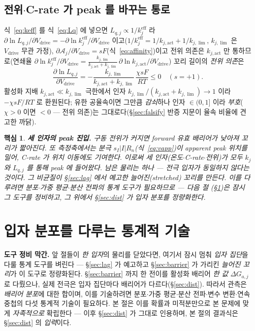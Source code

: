 \documentclass[11pt,a4paper]{article}
\newtheorem*{keybox}{핵심}
\newcommand{\eff}{\mathrm{eff}}
\newcommand{\drive}{\mathrm{drive}}
\begin{document}
\subsection{전위$\cdot$C-rate 가 peak 를 바꾸는 통로}
식~\eqref{eq:keff} 를 식~\eqref{eq:Lq} 에 넣으면 $L_{q,j}\propto1/k_j^{\eff}$ 라 $\partial\ln L_{q,j}/\partial V_\drive=-\partial\ln k_j^{\eff}/\partial V_\drive$ 이고($1/k_j^{\eff}=1/k_{j,\mathrm{act}}+1/k_{j,\lim}$,
$k_{j,\lim}$ 은 $V_\drive$ 무관 가정), $\partial\mathcal A_j/\partial V_\drive=sF$(식~\eqref{eq:affinity})이고 전위 의존은
$k_{j,\mathrm{act}}$ 만 통하므로(연쇄율 $\partial\ln k_j^{\eff}/\partial V_\drive=\tfrac{k_{j,\lim}}{k_{j,\mathrm{act}}+k_{j,\lim}}\,\partial\ln k_{j,\mathrm{act}}/\partial V_\drive$)
꼬리 길이의 \emph{전위 의존}은
\begin{equation}
\frac{\partial\ln L_{q,j}}{\partial V_\drive}=-\frac{k_{j,\lim}}{k_{j,\mathrm{act}}+k_{j,\lim}}\,\frac{\chi sF}{RT}\le0\quad(s=+1).
\label{eq:LqV}
\end{equation}
활성화 지배 $k_{j,\mathrm{act}}\ll k_{j,\lim}$ 극한에서 인자 $k_{j,\lim}/(k_{j,\mathrm{act}}+k_{j,\lim})\to1$ 이라 $-\chi sF/RT$ 로
환원된다; 유한 공율속이면 그만큼 \emph{감쇠}하나 인자 $\in(0,1]$ 이라 \emph{부호}($\chi>0$ 이면 $<0$ — 전위 의존)는
그대로다(\S\ref{sec:falsify} 반증 지문이 율속 비율에 견고한 까닭).
\begin{keybox}
\textbf{세 인자의 peak 진입.} 구동 전위가 커지면 forward 유효 배리어가 낮아져 꼬리가 \emph{짧아진다}. 또 측정축에서는 분극
$s_I|I|R_n$(식~\eqref{eq:vapp})이 apparent peak 위치를 밀어, C-rate 가 \emph{위치} 이동에도 기여한다. \emph{이로써
세 인자(온도$\cdot$C-rate$\cdot$전위)가 모두 $k_j$ 와 $L_{q,j}$ 를 통해 peak 에 들어왔다.} 남은 물리는 하나 —
전극 입자가 \emph{동일하지 않다}는 것이다. 그 비균질이 \S\ref{sec:lag} 에서 예고한 \emph{늘어진}(stretched) 꼬리를
만든다. 이를 다루려면 분포$\cdot$가중 평균$\cdot$분산 전파의 통계 도구가 필요하므로 — \emph{다음 절
(\S\ref{sec:stattools})은 잠시 그 도구를 정비}하고, 그 위에서 \S\ref{sec:dist} 가 입자 분포를 정량화한다.
\end{keybox}

\section{입자 분포를 다루는 통계적 기술}\label{sec:stattools}
\textbf{도구 정비 막간.} 앞 절들이 \emph{한 입자}의 물리를 닫았다면, 여기서 잠시 멈춰 \emph{입자 집단}을 다룰
통계 도구를 벼린다 — \S\ref{sec:lag} 가 예고하고 \S\ref{sec:barrier} 가 가리킨 \emph{늘어진 꼬리}가 이 도구로
정량화된다.
\S\ref{sec:barrier} 까지 한 전이를 활성화 배리어 \emph{한 값} $\Delta G_{a,j}$ 로 다뤘으나, 실제 전극은
입자 집단마다 배리어가 다르다(\S\ref{sec:dist}). 따라서 관측은 \emph{배리어 분포}에 대한 합이며, 이를 기술하려면
분포$\cdot$가중 평균$\cdot$분산 전파$\cdot$변수 변환$\cdot$연속 중첩의 다섯 통계적 기술이 필요하다. 본 절은 이를
확률과 미적분만으로 본 문제에 맞게 \emph{자족적으로} 확립한다 — 이후 \S\ref{sec:dist} 가 그대로 인용하며, 본 절의
결과식은 \S\ref{sec:dist} 의 \emph{입력}이다.
\end{document}

